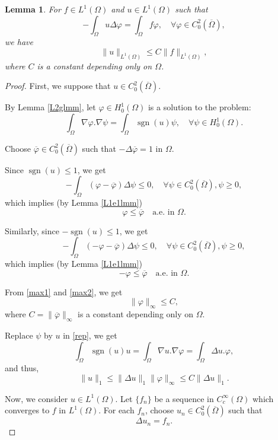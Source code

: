 \documentclass[a4paper, 11pt]{report}
\newtheorem{lmm}{Lemma}[chapter]
\theoremstyle{definition}\newtheorem*{rmk}{Remark}
\DeclareMathOperator{\sgn}{sgn}
\begin{document}
\begin{lmm}\label{L1e2lmm}
For $f \in L^1(\Omega)$ and $u\in L^1(\Omega)$ such that
\[
-\int_{\Omega} u\Delta \varphi = \int_{\Omega} f \varphi, \quad \forall \varphi \in C^2_0(\overline{\Omega}),
\]
we have
\[
\| u \|_{L^1(\Omega)} \le C\| f\|_{L^1(\Omega)},
\]
where $C$ is a constant depending only on $\Omega$.
\end{lmm}
\begin{proof}
\mbox{}

First, we suppose that $u\in C^2_0(\overline{\Omega})$.

By Lemma \ref{L2glmm}, let $\varphi \in H^1_0(\Omega)$ is a solution to the problem:
\begin{equation}\label{rep}
\int_{\Omega} \nabla \varphi.\nabla \psi = \int_{\Omega} \sgn(u) \psi, \quad \forall \psi \in H^1_0(\Omega).
\end{equation}

Choose $\overline{\varphi} \in C^2_0(\overline{\Omega})$ such that $-\Delta \overline{\varphi} = 1$ in $\Omega$.

Since $\sgn(u)\le 1$, we get
\[
-\int_{\Omega} (\varphi - \overline{\varphi})\Delta \psi \le 0, \quad \forall \psi \in C_0^2(\overline{\Omega}), \psi \ge 0,
\]
which implies (by Lemma \ref{L1e1lmm})
\begin{equation}\label{max1}
\varphi \le \overline{\varphi} \quad \text{a.e.\ in }\Omega.
\end{equation}

Similarly, since $-\sgn(u)\le 1$, we get
\[
-\int_{\Omega} (-\varphi - \overline{\varphi})\Delta \psi \le 0, \quad \forall \psi \in C_0^2(\overline{\Omega}), \psi \ge 0,
\]
which implies (by Lemma \ref{L1e1lmm})
\begin{equation}\label{max2}
-\varphi \le \overline{\varphi} \quad \text{a.e.\ in }\Omega.
\end{equation}

From \eqref{max1} and \eqref{max2}, we get
\[
\| \varphi\|_{\infty} \le C,
\]
where $C = \| \overline{\varphi}\|_{\infty}$ is a constant depending only on $\Omega$.

Replace $\psi$ by $u$ in \eqref{rep}, we get
\[
\int_{\Omega}\sgn(u)u = \int_{\Omega}\nabla u.\nabla \varphi = \int_{\Omega}\Delta u .\varphi,
\]
and thus,
\begin{equation}\label{case1}
\| u\|_{1} \le \| \Delta u\|_{1} \| \varphi\|_{\infty} \le C\| \Delta u\|_{1}.
\end{equation}

Now, we consider $u\in L^1(\Omega)$. Let $\{f_n\}$ be a sequence in $C^{\infty}_c(\Omega)$ which converges to $f$ in $L^1(\Omega)$. For each $f_n$, choose $u_n \in C^2_0(\overline{\Omega})$ such that
\begin{equation}\label{dddd}
\Delta u_n = f_n .
\end{equation}


\end{proof}
\end{document}
